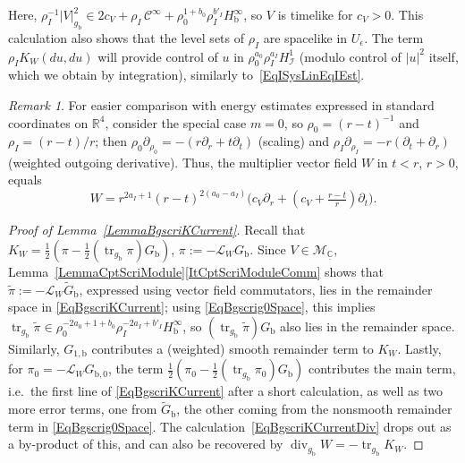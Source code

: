 \documentclass[reqno,11pt,letterpaper]{amsart}
\numberwithin{equation}{section}
\numberwithin{figure}{section}
\theoremstyle{definition}
\theoremstyle{remark}
\newtheorem{rmk}[thm]{Remark}
\newcommand{\mc}{\mathcal}
\newcommand{\cC}{\mc C}
\newcommand{\cL}{\mc L}
\newcommand{\cM}{\mc M}
\newcommand{\ms}{\mathscr}
\newcommand{\scri}{\ms I}
\newcommand{\C}{\mathbb{C}}
\newcommand{\R}{\mathbb{R}}
\newcommand{\tr}{\operatorname{tr}}
\newcommand{\dv}{\operatorname{div}}
\newcommand{\eps}{\epsilon}
\newcommand{\pa}{\partial}
\newcommand{\ul}[1]{\underline{#1}{}}
\newcommand{\wt}{\widetilde}
\newcommand{\bop}{{\mathrm{b}}}
\newcommand{\half}{\tfrac{1}{2}}
\newcommand{\CI}{\cC^\infty}
\newcommand{\Hb}{H_{\bop}}
\newcommand{\Hscri}{H_{\scri}}
\newcommand{\usref}[1]{{\upshape\ref{#1}}}
\begin{document}
Here, $\rho_I^{-1}|V|_{g_\bop}^2\in 2 c_V+\rho_I\,\CI+\rho_0^{1+b_0}\rho_I^{b'_I}\Hb^\infty$, so $V$ is timelike for $c_V>0$. This calculation also shows that the level sets of $\rho_I$ are spacelike in $U_\eps$. The term $\rho_I K_W(d u,d u)$ will provide control of $u$ in $\rho_0^{a_0}\rho_I^{a_I}\Hscri^1$ (modulo control of $|u|^2$ itself, which we obtain by integration), similarly to~\eqref{EqISysLinEqIEst}.

\begin{rmk}
\label{RmkBgscriKCurrent0}
  For easier comparison with energy estimates expressed in standard coordinates on $\R^4$, consider the special case $m=0$, so $\rho_0=(r-t)^{-1}$ and $\rho_I=(r-t)/r$; then $\rho_0\pa_{\rho_0}=-(r\pa_r+t\pa_t)$ (scaling) and $\rho_I\pa_{\rho_I}=-r(\pa_t+\pa_r)$ (weighted outgoing derivative). Thus, the multiplier vector field $W$ in $t<r$, $r>0$, equals
  \[
    W = r^{2 a_I+1}(r-t)^{2(a_0-a_I)}\bigl(c_V\pa_r + (c_V+\tfrac{r-t}{r})\pa_t\bigr).
  \]
\end{rmk}

\begin{proof}[Proof of Lemma~\usref{LemmaBgscriKCurrent}]
  Recall that $K_W=\half(\pi-\half(\tr_{g_\bop}\pi)G_\bop)$, $\pi:=-\cL_W G_\bop$. Since $V\in\cM_{\ul\C}$, Lemma~\ref{LemmaCptScriModule}\eqref{ItCptScriModuleComm} shows that $\wt\pi:=-\cL_W \wt G_\bop$, expressed using vector field commutators, lies in the remainder space in \eqref{EqBgscriKCurrent}; using \eqref{EqBgscrig0Space}, this implies $\tr_{g_\bop}\wt\pi \in \rho_0^{-2 a_0+1+b_0}\rho_I^{-2 a_I+b'_I}\Hb^\infty$, so $(\tr_{g_\bop}\wt\pi)G_\bop$ also lies in the remainder space. Similarly, $G_{1,\bop}$ contributes a (weighted) smooth remainder term to $K_W$. Lastly, for $\pi_0=-\cL_W G_{\bop,0}$, the term $\half(\pi_0-\half(\tr_{g_\bop}\pi_0)G_\bop)$ contributes the main term, i.e.\ the first line of \eqref{EqBgscriKCurrent} after a short calculation, as well as two more error terms, one from $\wt G_\bop$, the other coming from the nonsmooth remainder term in \eqref{EqBgscrig0Space}. The calculation~\eqref{EqBgscriKCurrentDiv} drops out as a by-product of this, and can also be recovered by $\dv_{g_\bop}W=-\tr_{g_\bop}K_W$.
\end{proof}
\end{document}
